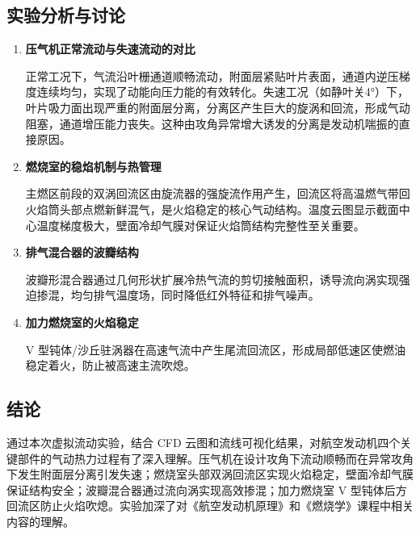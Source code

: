 \subsection{实验分析与讨论}

\begin{enumerate}
    \item \textbf{压气机正常流动与失速流动的对比}

    正常工况下，气流沿叶栅通道顺畅流动，附面层紧贴叶片表面，通道内逆压梯度连续均匀，实现了动能向压力能的有效转化。失速工况（如静叶关4°）下，叶片吸力面出现严重的附面层分离，分离区产生巨大的旋涡和回流，形成气动阻塞，通道增压能力丧失。这种由攻角异常增大诱发的分离是发动机喘振的直接原因。

    \item \textbf{燃烧室的稳焰机制与热管理}

    主燃区前段的双涡回流区由旋流器的强旋流作用产生，回流区将高温燃气带回火焰筒头部点燃新鲜混气，是火焰稳定的核心气动结构。温度云图显示截面中心温度梯度极大，壁面冷却气膜对保证火焰筒结构完整性至关重要。

    \item \textbf{排气混合器的波瓣结构}

    波瓣形混合器通过几何形状扩展冷热气流的剪切接触面积，诱导流向涡实现强迫掺混，均匀排气温度场，同时降低红外特征和排气噪声。

    \item \textbf{加力燃烧室的火焰稳定}

    V 型钝体/沙丘驻涡器在高速气流中产生尾流回流区，形成局部低速区使燃油稳定着火，防止被高速主流吹熄。
\end{enumerate}

\subsection{结论}

通过本次虚拟流动实验，结合 CFD 云图和流线可视化结果，对航空发动机四个关键部件的气动热力过程有了深入理解。压气机在设计攻角下流动顺畅而在异常攻角下发生附面层分离引发失速；燃烧室头部双涡回流区实现火焰稳定，壁面冷却气膜保证结构安全；波瓣混合器通过流向涡实现高效掺混；加力燃烧室 V 型钝体后方回流区防止火焰吹熄。实验加深了对《航空发动机原理》和《燃烧学》课程中相关内容的理解。
